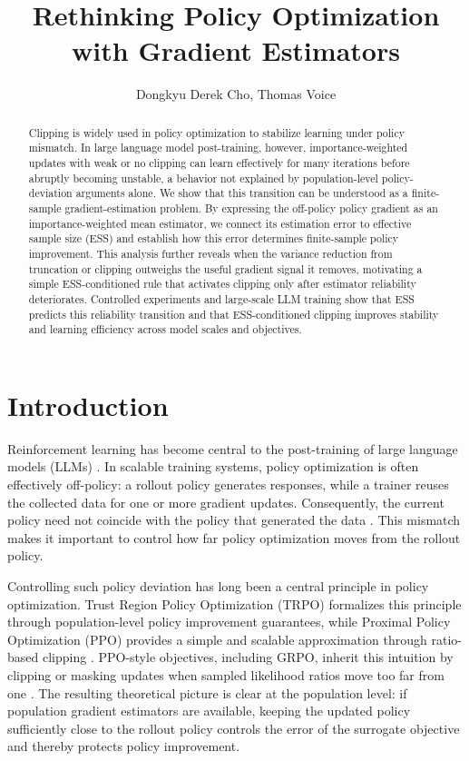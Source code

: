 \documentclass[11pt]{article}
\title{\bf Rethinking Policy Optimization with Gradient Estimators}
\author{Dongkyu Derek Cho, Thomas Voice}
\date{}
\theoremstyle{remark}
\begin{document}
\maketitle

\begin{abstract}
Clipping is widely used in policy optimization to stabilize learning under policy mismatch. In large language model post-training, however, importance-weighted updates with weak or no clipping can learn effectively for many iterations before abruptly becoming unstable, a behavior not explained by population-level policy-deviation arguments alone. We show that this transition can be understood as a finite-sample gradient-estimation problem. By expressing the off-policy policy gradient as an importance-weighted mean estimator, we connect its estimation error to effective sample size (ESS) and establish how this error determines finite-sample policy improvement. This analysis further reveals when the variance reduction from truncation or clipping outweighs the useful gradient signal it removes, motivating a simple ESS-conditioned rule that activates clipping only after estimator reliability deteriorates. Controlled experiments and large-scale LLM training show that ESS predicts this reliability transition and that ESS-conditioned clipping improves stability and learning efficiency across model scales and objectives.
\end{abstract}

\section{Introduction}
Reinforcement learning has become central to the post-training of large language
models (LLMs) \citep{bai2022hh,shao2024deepseekmath,yu2025dapo}. In scalable
training systems, policy optimization is often effectively off-policy: a rollout
policy generates responses, while a trainer reuses the collected data for one or
more gradient updates. Consequently, the current policy need not coincide with
the policy that generated the data \citep{qi2026dppo}. This mismatch makes it
important to control how far policy optimization moves from the rollout policy.

Controlling such policy deviation has long been a central principle in policy
optimization. Trust Region Policy Optimization (TRPO) formalizes this principle
through population-level policy improvement guarantees, while Proximal Policy
Optimization (PPO) provides a simple and scalable approximation through
ratio-based clipping \citep{schulman2015trpo,schulman2017ppo}. PPO-style
objectives, including GRPO, inherit this intuition by clipping or masking updates
when sampled likelihood ratios move too far from one
\citep{shao2024deepseekmath}. The resulting theoretical picture is clear at the population level: if population gradient estimators are available, keeping the updated policy sufficiently close to the rollout policy controls the error of the surrogate objective and thereby protects policy improvement.
\end{document}
